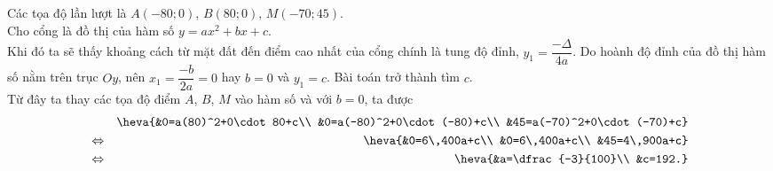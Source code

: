 \begin{bt}
{\begin{center}
		\end{center}
		Các tọa độ lần lượt là $A(-80;0)$, $B(80;0)$, $M(-70;45)$.\\
		Cho cổng là đồ thị của hàm số $y=ax^2+bx+c$.\\
		Khi đó ta sẽ thấy khoảng cách từ mặt đất đến điểm cao nhất của cổng chính là tung độ đỉnh, $y_1=\dfrac{-\Delta}{4a}$. Do hoành độ đỉnh của đồ thị hàm số nằm trên trục $Oy$, nên $x_1=\dfrac{-b}{2a}=0$ hay $b=0$ và $y_1=c$. Bài toán trở thành tìm $c$.\\
		Từ đây ta thay các tọa độ điểm $A$, $B$, $M$ vào hàm số và với $b=0$, ta được
		\begin{eqnarray*}
			&&\heva{&0=a(80)^2+0\cdot80+c\\ &0=a(-80)^2+0\cdot(-80)+c\\ &45=a(-70)^2+0\cdot(-70)+c}\\
			&\Leftrightarrow&\heva{&0=6\,400a+c\\ &0=6\,400a+c\\ &45=4\,900a+c}\\
			&\Leftrightarrow&\heva{&a=\dfrac{-3}{100}\\ &c=192.}
		\end{eqnarray*}
	}
\end{bt}

